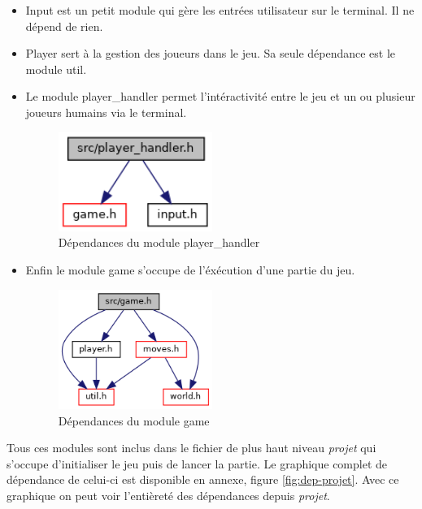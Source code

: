 \begin{itemize}
    \item Input est un petit module qui gère les entrées utilisateur sur le terminal. Il ne dépend de rien.

    \item Player sert à la gestion des joueurs dans le jeu. Sa seule dépendance est le module util.

    \item Le module player\_handler permet l'intéractivité entre le jeu et un ou plusieur joueurs humains via le terminal.
    \begin{figure}[H]
        \centering \includegraphics[width=5cm]{images/player__handler_8h__incl.png}
        \caption{Dépendances du module player\_handler}
        \label{fig:dep-playerhandler}
    \end{figure}

    \item Enfin le module game s'occupe de l'éxécution d'une partie du jeu. 
    \begin{figure}[H]
        \centering \includegraphics[width=5cm]{images/game_8h__incl.png}
        \caption{Dépendances du module game}
        \label{fig:dep-game}
    \end{figure}

\end{itemize}



Tous ces modules sont inclus dans le fichier de plus haut niveau \emph{projet} qui s'occupe 
d'initialiser le jeu puis de lancer la partie.
Le graphique complet de dépendance
de celui-ci est disponible en annexe, figure \ref{fig:dep-projet}. Avec ce graphique on peut voir l'entièreté des dépendances depuis \emph{projet}. 






